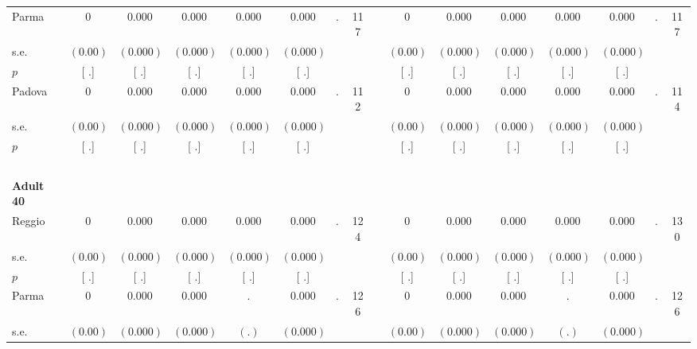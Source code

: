 \begin{longtable}{L{8em} c c c c c c c p{1em} c c c c c c c}
\quad \quad \quad Parma& 0 &     0.000 &     0.000 &     0.000 &     0.000 &         . &       117 & & 0 &     0.000 &     0.000 &     0.000 &     0.000 &         . &       117  \\*
\quad \quad \quad \quad s.e.& $ (     0.00)$ & $ (    0.000)$ & $ (    0.000)$ & $ (    0.000)$ & $ (    0.000)$ & & & & $ (     0.00)$ & $ (    0.000)$ & $ (    0.000)$ & $ (    0.000)$ & $ (    0.000)$ & &  \\*
\quad \quad \quad \quad $ p$ & [        .] & [        .] & [        .] & [        .] & [        .] & & & & [        .] & [        .] & [        .] & [        .] & [        .] & &  \\[1em]
\quad \quad \quad Padova& 0 &     0.000 &     0.000 &     0.000 &     0.000 &         . &       112 & & 0 &     0.000 &     0.000 &     0.000 &     0.000 &         . &       114  \\*
\quad \quad \quad \quad s.e.& $ (     0.00)$ & $ (    0.000)$ & $ (    0.000)$ & $ (    0.000)$ & $ (    0.000)$ & & & & $ (     0.00)$ & $ (    0.000)$ & $ (    0.000)$ & $ (    0.000)$ & $ (    0.000)$ & &  \\*
\quad \quad \quad \quad $ p$ & [        .] & [        .] & [        .] & [        .] & [        .] & & & & [        .] & [        .] & [        .] & [        .] & [        .] & &  \\[1em]
~\\[1em]
\quad \quad \textbf{Adult 40} & & & & & & & & & & & & & & & \\* 
\quad \quad \quad Reggio& 0 &     0.000 &     0.000 &     0.000 &     0.000 &         . &       124 & & 0 &     0.000 &     0.000 &     0.000 &     0.000 &         . &       130  \\*
\quad \quad \quad \quad s.e.& $ (     0.00)$ & $ (    0.000)$ & $ (    0.000)$ & $ (    0.000)$ & $ (    0.000)$ & & & & $ (     0.00)$ & $ (    0.000)$ & $ (    0.000)$ & $ (    0.000)$ & $ (    0.000)$ & &  \\*
\quad \quad \quad \quad $ p$ & [        .] & [        .] & [        .] & [        .] & [        .] & & & & [        .] & [        .] & [        .] & [        .] & [        .] & &  \\[1em]
\quad \quad \quad Parma& 0 &     0.000 &     0.000 &         . &     0.000 &         . &       126 & & 0 &     0.000 &     0.000 &         . &     0.000 &         . &       126  \\*
\quad \quad \quad \quad s.e.& $ (     0.00)$ & $ (    0.000)$ & $ (    0.000)$ & $ (        .)$ & $ (    0.000)$ & & & & $ (     0.00)$ & $ (    0.000)$ & $ (    0.000)$ & $ (        .)$ & $ (    0.000)$ & &  \\*

\end{longtable}
